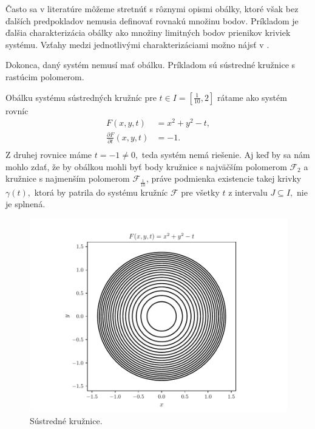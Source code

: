 Často sa v literatúre môžeme stretnúť s rôznymi opismi obálky, ktoré však bez ďalších predpokladov nemusia definovať rovnakú množinu bodov. Príkladom je ďalšia charakterizácia obálky ako množiny limitných bodov prienikov kriviek systému. Vzťahy medzi jednotlivými charakterizáciami možno nájsť v \cite{Bru81}.  

Dokonca, daný systém nemusí mať obálku. Príkladom sú sústredné kružnice s rastúcim polomerom.

\begin{example} 
Obálku systému sústredných kružníc pre $t \in I=[\frac{1}{10},2]$ rátame ako systém rovníc
\begin{align*}
F(x, y, t) &= x^2 + y^2 - t, \\
\frac{\partial F}{\partial t}(x,y,t) &= -1. \\
\end{align*}
Z druhej rovnice máme $t=-1 \neq 0,$ teda systém nemá riešenie. Aj keď by sa nám mohlo zdať, že by obálkou mohli byť body kružnice s najväčším polomerom $\mathcal{F}_2$ a kružnice s najmenším polomerom $\mathcal{F}_{\frac{1}{10}}$, práve podmienka existencie takej krivky $\gamma(t),$ ktorá by patrila do systému kružníc $\mathcal{F}$ pre všetky $t$ z intervalu $J \subseteq  I, $ nie je splnená.
\end{example}

\begin{figure}[H]
	\centering
	\includegraphics[trim={0 0.35cm 0 0.85cm},clip]{images/concentric_circles.pdf}
	\caption{Sústredné kružnice.}
	\label{fig:concentric_circles}
\end{figure}

